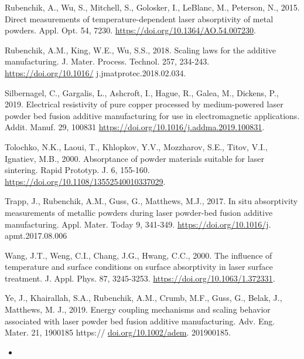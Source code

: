 \documentclass[10pt]{article}
\begin{document}
Rubenchik, A., Wu, S., Mitchell, S., Golosker, I., LeBlanc, M., Peterson, N., 2015. Direct measurements of temperature-dependent laser absorptivity of metal powders. Appl. Opt. 54, 7230. \href{https://doi.org/10.1364/AO.54.007230}{https://doi.org/10.1364/AO.54.007230}.

Rubenchik, A.M., King, W.E., Wu, S.S., 2018. Scaling laws for the additive manufacturing. J. Mater. Process. Technol. 257, 234-243. \href{https://doi.org/10.1016/}{https://doi.org/10.1016/} j.jmatprotec.2018.02.034.

Silbernagel, C., Gargalis, L., Ashcroft, I., Hague, R., Galea, M., Dickens, P., 2019. Electrical resistivity of pure copper processed by medium-powered laser powder bed fusion additive manufacturing for use in electromagnetic applications. Addit. Manuf. 29, 100831 \href{https://doi.org/10.1016/j.addma.2019.100831}{https://doi.org/10.1016/j.addma.2019.100831}.

Tolochko, N.K., Laoui, T., Khlopkov, Y.V., Mozzharov, S.E., Titov, V.I., Ignatiev, M.B., 2000. Absorptance of powder materials suitable for laser sintering. Rapid Prototyp. J. 6, 155-160. \href{https://doi.org/10.1108/13552540010337029}{https://doi.org/10.1108/13552540010337029}.

Trapp, J., Rubenchik, A.M., Guss, G., Matthews, M.J., 2017. In situ absorptivity measurements of metallic powders during laser powder-bed fusion additive manufacturing. Appl. Mater. Today 9, 341-349. \href{https://doi.org/10.1016/j}{https://doi.org/10.1016/j}. apmt.2017.08.006

Wang, J.T., Weng, C.I., Chang, J.G., Hwang, C.C., 2000. The influence of temperature and surface conditions on surface absorptivity in laser surface treatment. J. Appl. Phys. 87, 3245-3253. \href{https://doi.org/10.1063/1.372331}{https://doi.org/10.1063/1.372331}.

Ye, J., Khairallah, S.A., Rubenchik, A.M., Crumb, M.F., Guss, G., Belak, J., Matthews, M. J., 2019. Energy coupling mechanisms and scaling behavior associated with laser powder bed fusion additive manufacturing. Adv. Eng. Mater. 21, 1900185 https:// \href{http://doi.org/10.1002/adem}{doi.org/10.1002/adem}. 201900185.

\begin{itemize}
  \item 
\end{itemize}
\end{document}

